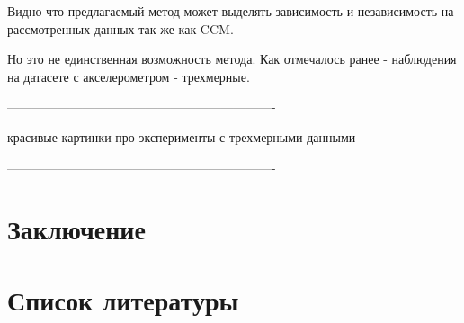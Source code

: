 \documentclass[12pt, twoside]{article}
\begin{document}
Видно что предлагаемый метод может выделять зависимость и независимость на рассмотренных данных так же как   CCM.

Но это не единственная возможность метода. Как отмечалось ранее - наблюдения на датасете с акселерометром - трехмерные.

----------------------------------------------------------------

красивые картинки про эксперименты с трехмерными данными

----------------------------------------------------------------

\section{Заключение}


\section{Список литературы}


\end{document}
